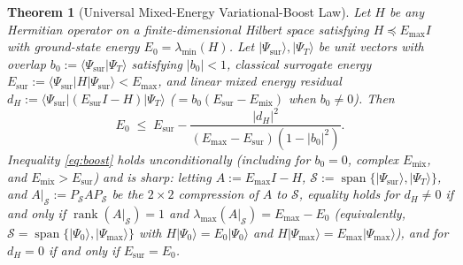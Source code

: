\documentclass[11pt,a4paper]{article}
\newtheorem{theorem}{Theorem}[section]
\theoremstyle{definition}
\DeclareMathOperator{\rank}{rank}
\newcommand{\ket}[1]{\lvert #1 \rangle}
\newcommand{\bra}[1]{\langle #1 \rvert}
\newcommand{\braket}[2]{\langle #1 \vert #2 \rangle}
\begin{document}
\begin{theorem}[Universal Mixed-Energy Variational-Boost Law]\label{thm:boost}
Let $H$ be any Hermitian operator on a finite-dimensional Hilbert space satisfying $H \preceq E_{\max} I$ with ground-state energy $E_0 = \lambda_{\min}(H)$. Let $\ket{\Psi_{\mathrm{sur}}}, \ket{\Psi_T}$ be unit vectors with overlap $b_0 := \braket{\Psi_{\mathrm{sur}}}{\Psi_T}$ satisfying $|b_0| < 1$, classical surrogate energy $E_{\mathrm{sur}} := \bra{\Psi_{\mathrm{sur}}} H \ket{\Psi_{\mathrm{sur}}} < E_{\max}$, and linear mixed energy residual $d_H := \bra{\Psi_{\mathrm{sur}}} (E_{\mathrm{sur}} I - H) \ket{\Psi_T}$ ($= b_0(E_{\mathrm{sur}} - E_{\mathrm{mix}})$ when $b_0 \neq 0$). Then
\begin{equation}\label{eq:boost}
  E_0 \;\le\; E_{\mathrm{sur}} - \frac{|d_H|^2}{(E_{\max} - E_{\mathrm{sur}})(1 - |b_0|^2)}.
\end{equation}
Inequality \eqref{eq:boost} holds unconditionally (including for $b_0 = 0$, complex $E_{\mathrm{mix}}$, and $E_{\mathrm{mix}} > E_{\mathrm{sur}}$) and is sharp: letting $A := E_{\max} I - H$, $\mathcal{S} := \operatorname{span}\{\ket{\Psi_{\mathrm{sur}}}, \ket{\Psi_T}\}$, and $A|_{\mathcal{S}} := P_{\mathcal{S}} A P_{\mathcal{S}}$ be the $2\times 2$ compression of $A$ to $\mathcal{S}$, equality holds for $d_H \neq 0$ if and only if $\rank(A|_{\mathcal{S}}) = 1$ and $\lambda_{\max}(A|_{\mathcal{S}}) = E_{\max} - E_0$ (equivalently, $\mathcal{S} = \operatorname{span}\{\ket{\Psi_0}, \ket{\Psi_{\max}}\}$ with $H\ket{\Psi_0} = E_0\ket{\Psi_0}$ and $H\ket{\Psi_{\max}} = E_{\max}\ket{\Psi_{\max}}$), and for $d_H = 0$ if and only if $E_{\mathrm{sur}} = E_0$.
\end{theorem}
\end{document}
